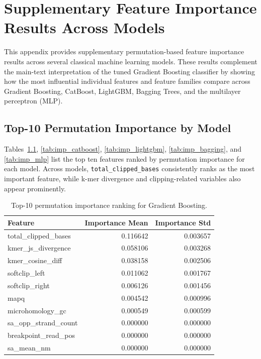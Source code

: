 \chapter{Supplementary Feature Importance Results Across Models}
\label{app:supp_feature_importance}

This appendix provides supplementary permutation-based feature importance results across several classical machine learning models. These results complement the main-text interpretation of the tuned Gradient Boosting classifier by showing how the most influential individual features and feature families compare across Gradient Boosting, CatBoost, LightGBM, Bagging Trees, and the multilayer perceptron (MLP).

\section{Top-10 Permutation Importance by Model}
\label{app:top10_importance_models}

Tables~\ref{tab:imp_gb}, \ref{tab:imp_catboost}, \ref{tab:imp_lightgbm}, \ref{tab:imp_bagging}, and \ref{tab:imp_mlp} list the top ten features ranked by permutation importance for each model. Across models, \texttt{total\_clipped\_bases} consistently ranks as the most important feature, while k-mer divergence and clipping-related variables also appear prominently.

\begin{table}[H]
\centering
\small
\caption{Top-10 permutation importance ranking for Gradient Boosting.}
\label{tab:imp_gb}
\begin{tabular}{lrr}
\toprule
Feature & Importance Mean & Importance Std \\
\midrule
total\_clipped\_bases & 0.116642 & 0.003657 \\
kmer\_js\_divergence & 0.058106 & 0.003268 \\
kmer\_cosine\_diff & 0.038158 & 0.002506 \\
softclip\_left & 0.011062 & 0.001767 \\
softclip\_right & 0.006126 & 0.001456 \\
mapq & 0.004542 & 0.000996 \\
microhomology\_gc & 0.000549 & 0.000599 \\
sa\_opp\_strand\_count & 0.000000 & 0.000000 \\
breakpoint\_read\_pos & 0.000000 & 0.000000 \\
sa\_mean\_nm & 0.000000 & 0.000000 \\
\bottomrule
\end{tabular}
\end{table}

